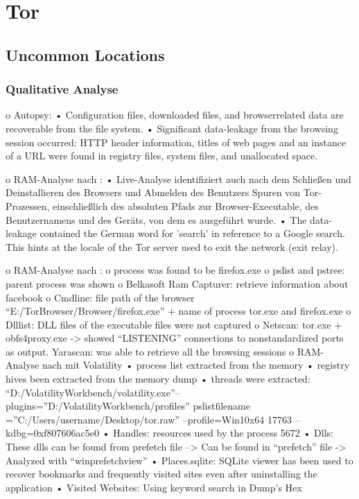 \section{Tor}

\subsection*{Uncommon Locations}

\subsubsection*{Qualitative Analyse}

o Autopsy: \cite{Muir.2019}
	•	Configuration files, downloaded files, and browserrelated data are recoverable from the file system.
	•	Significant data-leakage from the browsing session occurred: HTTP header information, titles of web pages and an instance of a URL were found in registry files, system files, and unallocated space.



o RAM-Analyse nach \cite{Muir.2019}:
	•	Live-Analyse identifiziert auch nach dem Schließen und Deinstallieren des Browsers und Abmelden des Benutzers Spuren von Tor-Prozessen, einschließlich des absoluten Pfads zur Browser-Executable, des Benutzernamens und des Geräts, von dem es ausgeführt wurde.
	•	The data-leakage contained the German word for ’search’ in reference to a Google search. This hints at the locale of the Tor server used to exit the network (exit relay).

o RAM-Analyse nach \cite{Hariharan.2022}:
	o	process was found to be firefox.exe
	o	pslist and pstree: parent process was shown 
	o	Belkasoft Ram Capturer: retrieve information about facebook
	o	Cmdline: file path of the browser “E:/TorBrowser/Browser/firefox.exe” + name of process tor.exe and firefox.exe
	o	Dlllist: DLL files of the executable files were not captured
	o	Netscan: tor.exe + obfs4proxy.exe -> showed “LISTENING” connections to nonstandardized ports as output.
	Yarascan: was able to retrieve all the browsing sessions
o RAM-Analyse nach \cite{Sajan.2021} mit Volatility
	•	process list extracted from the memory
	•	registry hives been extracted from the memory dump
	•	threads were extracted: “D:/VolatilityWorkbench/volatility.exe”–plugins=”D:/VolatilityWorkbench/profiles” pslistfilename =”C:/Users/username/Desktop/tor.raw” –profile=Win10x64 17763 –kdbg=0xf807606ac5e0
	•	Handles: resources used by the process 5672
	•	Dlls: These dlls can be found from prefetch file --> Can be found in “prefetch” file -> Analyzed with “winprefetchview”
	•	Places.sqlite: SQLite viewer has been used to recover bookmarks and frequently visited sites even after uninstalling the application
	•	Visited Websites: Using keyword search in Dump’s Hex

